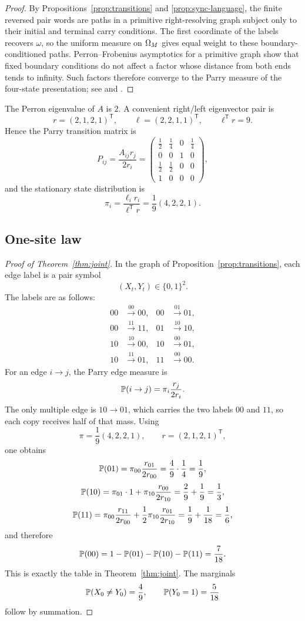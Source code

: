 \begin{proof}
By Propositions~\ref{prop:transitions} and \ref{prop:sync-language}, the finite reversed pair words are paths in a primitive right-resolving graph subject only to their initial and terminal carry conditions. The first coordinate of the labels recovers \(\omega\), so the uniform measure on \(\Omega_M\) gives equal weight to these boundary-conditioned paths. Perron--Frobenius asymptotics for a primitive graph show that fixed boundary conditions do not affect a factor whose distance from both ends tends to infinity. Such factors therefore converge to the Parry measure of the four-state presentation; see \cite[Section~8.4]{LindMarcus1995} and \cite[Chapter~2]{Kitchens1998}.
\end{proof}

The Perron eigenvalue of \(A\) is \(2\). A convenient right/left eigenvector pair is
\[
r=(2,1,2,1)^{\mathsf T},
\qquad
\ell=(2,2,1,1)^{\mathsf T},
\qquad
\ell^{\mathsf T}r=9.
\]
Hence the Parry transition matrix is
\[
P_{ij}=\frac{A_{ij}r_j}{2r_i}
=
\begin{pmatrix}
\frac12&\frac14&0&\frac14\\
0&0&1&0\\
\frac12&\frac12&0&0\\
1&0&0&0
\end{pmatrix},
\]
and the stationary state distribution is
\[
\pi_i=\frac{\ell_ir_i}{\ell^{\mathsf T}r}
=
\frac19(4,2,2,1).
\]

\subsection{One-site law}
\begin{proof}[Proof of Theorem~\ref{thm:joint}]
In the graph of Proposition~\ref{prop:transitions}, each edge label is a pair symbol
\[
(X_t,Y_t)\in\{0,1\}^2.
\]
The labels are as follows:
\[
\begin{aligned}
00 &\xrightarrow{00} 00, &
00 &\xrightarrow{01} 01,\\
00 &\xrightarrow{11} 11, &
01 &\xrightarrow{10} 10,
\end{aligned}
\]
\[
\begin{aligned}
10 &\xrightarrow{10} 00, &
10 &\xrightarrow{00} 01,\\
10 &\xrightarrow{11} 01, &
11 &\xrightarrow{00} 00.
\end{aligned}
\]
For an edge \(i\to j\), the Parry edge measure is
\[
\mathbb{P}(i\to j)=\pi_i\frac{r_j}{2r_i}.
\]
The only multiple edge is \(10\to 01\), which carries the two labels \(00\) and \(11\), so each copy receives half of that mass. Using
\[
\pi=\frac19(4,2,2,1),
\qquad
r=(2,1,2,1)^{\mathsf T},
\]
one obtains
\[
\mathbb{P}(01)=\pi_{00}\frac{r_{01}}{2r_{00}}=\frac49\cdot\frac14=\frac19,
\]
\[
\mathbb{P}(10)=\pi_{01}\cdot 1+\pi_{10}\frac{r_{00}}{2r_{10}}
=\frac29+\frac19=\frac13,
\]
\[
\mathbb{P}(11)=\pi_{00}\frac{r_{11}}{2r_{00}}+\frac12\pi_{10}\frac{r_{01}}{2r_{10}}
=\frac19+\frac1{18}=\frac16,
\]
and therefore
\[
\mathbb{P}(00)=1-\mathbb{P}(01)-\mathbb{P}(10)-\mathbb{P}(11)=\frac{7}{18}.
\]
This is exactly the table in Theorem~\ref{thm:joint}. The marginals
\[
\mathbb{P}(X_0\neq Y_0)=\frac49,
\qquad
\mathbb{P}(Y_0=1)=\frac{5}{18}
\]
follow by summation.
\end{proof}
